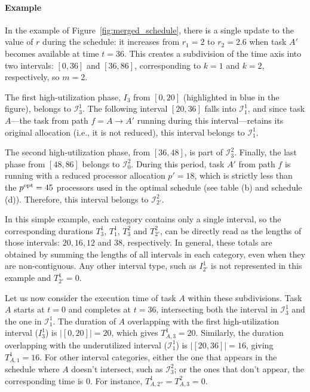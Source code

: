 \documentclass{article}
\newcommand\rratio{r\xspace}
\newcommand\opt{\textnormal{opt}\xspace}
\begin{document}
\paragraph{Example} In the example of Figure~\ref{fig:merged_schedule}, there is a single update to the value of $\rratio$ during the schedule: it increases from $\rratio_1 = 2$ to $\rratio_2 = 2.6$ when task $A'$ becomes available at time $t=36$. This creates a subdivision of the time axis into two intervals: $[0,36]$ and $[36,86]$, corresponding to $k = 1$ and $k = 2$, respectively, so $m=2$.

The first high-utilization phase, $I_3$ from $[0,20]$ (highlighted in blue in the figure), belongs to $\mathcal{I}_3^1$. The following interval $[20,36]$ falls into $\mathcal{I}_1^1$, and since task $A$—the task from path $f = A \rightarrow A'$ running during this interval—retains its original allocation (i.e., it is not reduced), this interval belongs to $\mathcal{I}_1^1$.

The second high-utilization phase, from $[36,48]$, is part of $\mathcal{I}_3^2$. Finally, the last phase from $[48,86]$ belongs to $\mathcal{I}_0^2$. During this period, task $A'$ from path $f$ is running with a reduced processor allocation $p' = 18$, which is strictly less than the $p^{\opt} = 45$ processors used in the optimal schedule (see table (b) and schedule (d)). Therefore, this interval belongs to $\mathcal{I}_{2'}^2$.

In this simple example, each category contains only a single interval, so the corresponding durations $T_3^1$, $T_{1}^1$,  $T_3^2$ and $T_{2'}^2$, can be directly read as the lengths of those intervals: $20, 16, 12$ and $38$, respectively. In general, these totals are obtained by summing the lengths of all intervals in each category, even when they are non-contiguous. Any other interval type, such as $I_{2'}^1$ is not represented in this example and $T_{2'}^1=0$.

Let us now consider the execution time of task $A$ within these subdivisions. Task $A$ starts at $t=0$ and completes at $t=36$, intersecting both the interval in $\mathcal{I}_3^1$ and the one in $\mathcal{I}_1^1$. The duration of $A$ overlapping with the first high-utilization interval ($I_3^1$) is $|[0,20]| = 20$, which gives $T_{A,3}^1 = 20$. Similarly, the duration overlapping with the underutilized interval ($\mathcal{I}_1^1$) is $|[20,36]| = 16$, giving $T_{A,1}^1 = 16$. For other interval categories, either the one that appears in the schedule where $A$ doesn't intersect, such as $\mathcal{I}_3^2$; or the ones that don't appear, the corresponding time is $0$. For instance, $T_{A,2''}^1 = T_{A,3}^2 = 0$.
\end{document}

